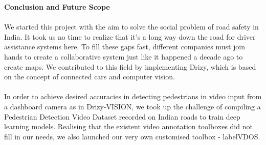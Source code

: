 \newpage
\begin{center}
\thispagestyle{empty}
\vspace{2cm}
\LARGE{\textbf{Conclusion and Future Scope}}\\[1.0cm]
\end{center}

\paragraph{}
We started this project with the aim to solve the social problem of road safety in India. It took us no time to realize that it's a long way down the road for driver assistance systems here. To fill these gaps fast, different companies must join hands to create a collaborative system just like it happened a decade ago to create maps. We contributed to this field by implementing Drizy, which is based on the concept of connected cars and computer vision.

\paragraph{}In order to achieve desired accuracies in detecting pedestrians in video input from a dashboard camera as in Drizy-VISION, we took up the challenge of compiling a Pedestrian Detection Video Dataset recorded on Indian roads to train deep learning models. Realising that the existent video annotation toolboxes did not fill in our needs, we also launched our very own customised toolbox - labelVDOS.

